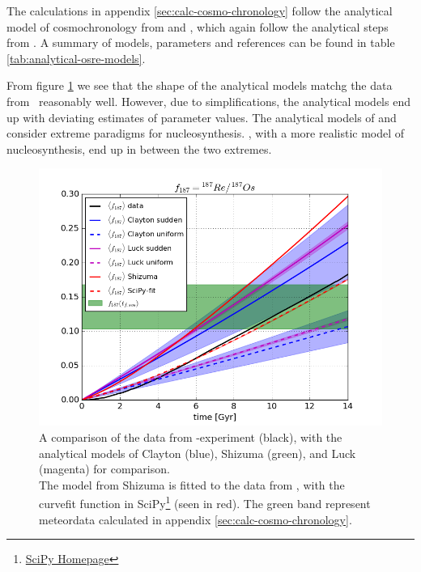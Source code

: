 The calculations in appendix \ref{sec:calc-cosmo-chronology} follow the analytical model of cosmochronology from  and , which again follow the analytical steps from .
A summary of models, parameters and references can be found in table \ref{tab:analytical-osre-models}.

From figure \ref{fig:osre-model-fitting} we see that the shape of the analytical models matchg the data from \omegamodel\ reasonably well.
However, due to simplifications, the analytical models end up with deviating estimates of parameter values.
The analytical models of  and  consider extreme paradigms for nucleosynthesis.
\omegamodel, with a more realistic model of nucleosynthesis, end up in between the two extremes.

\begin{figure}[h]
  \centering
  \includegraphics[width=\figwidth]{results/MCExperiment_revised_2_delmax/model_fitting.png}
  \caption[Analytical models for cosmochronology]{ \label{fig:osre-model-fitting}
    A comparison of the data from \omegamodel-experiment \expone (black), with the analytical models of Clayton (blue), Shizuma (green), and Luck (magenta) for comparison. \\
    The model from Shizuma is fitted to the data from \omegamodel, with the curvefit function in SciPy\footnote{\href{https://www.scipy.org/}{SciPy Homepage}} (seen in red).
    The green band represent meteordata calculated in appendix \ref{sec:calc-cosmo-chronology}.
  }
\end{figure}

